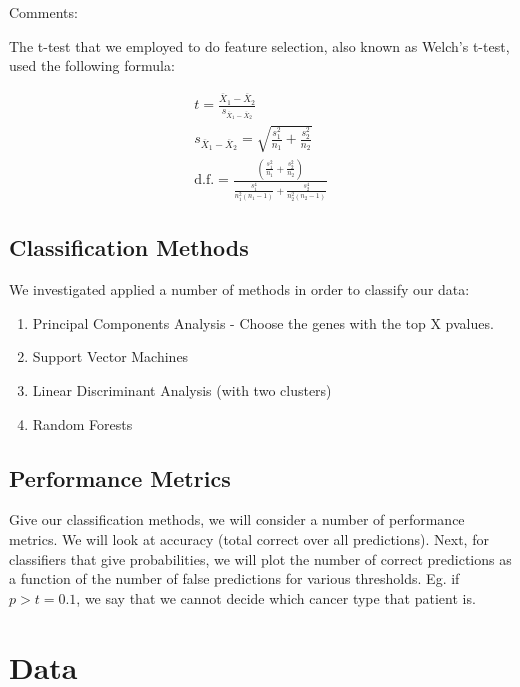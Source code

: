 
Comments:

The t-test that we employed to do feature selection, also known as Welch's
t-test, used the following formula:

\begin{gather}
t = \frac{\overline{X}_1-\overline{X}_2}{s_{\overline{X}_1-\overline{X}_2}} \\
s_{\overline{X}_1-\overline{X}_2} = \sqrt{\frac{s_1^2}{n_1}+\frac{s_2^2}{n_2}} \\
\text{d.f.} = \frac{\left(\frac{s_1^2}{n_1}+\frac{s_2^2}{n_2} \right)}{\frac{s_1^4}{n_1^2(n_1-1)} + \frac{s_2^4}{n_2^2(n_2-1)}}
\end{gather}

\subsection{Classification Methods}

We investigated applied a number of methods in order to classify our data:

\begin{enumerate}
\item Principal Components Analysis - Choose the genes with the top X pvalues. 
\item Support Vector Machines
\item Linear Discriminant Analysis (with two clusters)
\item Random Forests
\end{enumerate}

\subsection{Performance Metrics}

Give our classification methods, we will consider a number of performance
metrics. We will look at accuracy (total correct over all predictions). Next,
for classifiers that give probabilities, we will plot the number of correct
predictions as a function of the number of false predictions for various
thresholds. Eg. if $p>t=0.1$, we say that we cannot decide which cancer type
that patient is. 

\section{Data}

